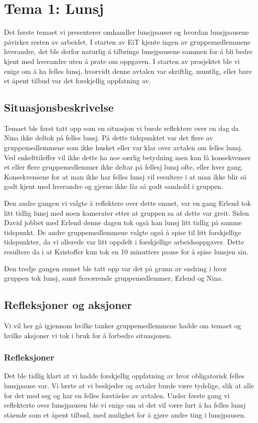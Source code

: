 \chapter{Tema 1: Lunsj}
Det første temaet vi presenterer omhandler lunsjpauser og hvordan lunsjpausene påvirker resten av arbeidet. I starten av EiT kjente ingen av gruppemedlemmene hverandre, det ble derfor naturlig å tilbringe lunsjpausene sammen for å bli bedre kjent med hverandre uten å prate om oppgaven. I starten av prosjektet ble vi enige om å ha felles lunsj, hvorvidt denne avtalen var skriftlig, muntlig, eller bare et åpent tilbud var det forskjellig oppfatning av.

\section{Situasjonsbeskrivelse}
Temaet ble først tatt opp som en situasjon vi burde reflektere over en dag da Nina ikke deltok på felles lunsj. På dette tidspunktet var det flere av gruppemedlemmene som ikke husket eller var klar over avtalen om felles lunsj. Ved enkelttileffer vil ikke dette ha noe særlig betydning men kan få konsekvenser et eller flere gruppemedlemmer ikke deltar på fellesj lunsj ofte, eller hver gang. Konsekvensene for at man ikke har felles lunsj vil resultere i at man ikke blir så godt kjent med hverandre og gjerne ikke får så godt samhold i gruppen. 

Den andre gangen vi valgte å reflektere over dette emnet, var en gang Erlend tok litt tidlig lunsj med noen kamerater etter at gruppen sa at dette var greit. Siden David jobbet med Erlend denne dagen tok også han lunsj litt tidlig på samme tidspunkt. De andre gruppemedlemmene valgte også å spise til litt forskjellige tidspunkter, da vi allerede var litt oppdelt i forskjellige arbeidsoppgaver. Dette resultere da i at Kristoffer kun tok en 10 minutters pause for å spise lunsjen sin. 

Den tredje gangen emnet ble tatt opp var det på grunn av endring i hvor gruppen tok lunsj, samt fraværende gruppemedlemmer, Erlend og Nina. 


\section{Refleksjoner og aksjoner}
Vi vil her gå igjennom hvilke tanker gruppemedlemmene hadde om temaet og hvilke aksjoner vi tok i bruk for å forbedre situasjonen.

\subsection*{Refleksjoner}
Det ble tidlig klart at vi hadde forskjellig oppfatning av hvor obligatorisk felles lunsjpause var. Vi lærte at vi beskjeder og avtaler burde være tydelige, slik at alle for det med seg og har en felles forståelse av avtalen. Under første gang vi reflekterte over lunsjpausen ble vi enige om at det vil være lurt å ha felles lunsj stående som et åpent tilbud, med mulighet for å gjøre andre ting i lunsjpausen. 

